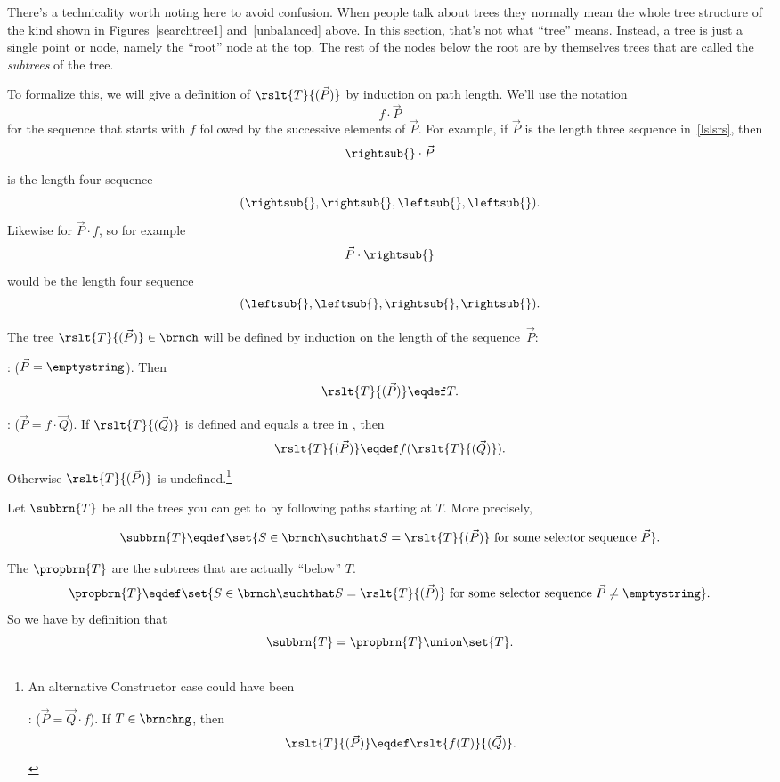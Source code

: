 \begin{definition}
There's a technicality worth noting here to avoid confusion.  When
people talk about trees they normally mean the whole tree structure of
the kind shown in Figures~\ref{searchtree1} and~\ref{unbalanced}
above.  In this section, that's not what ``tree'' means.  Instead, a
tree is just a single point or node, namely the ``root'' node at the
top.  The rest of the nodes below the root are by themselves trees
that are called the \emph{subtrees} of the tree.

To formalize this, we will give a definition of $\rslt{T}{(\vec{P})}$
by induction on path length.  We'll use the notation
\[
f \cdot \vec{P}
\]
for the sequence that starts with $f$ followed by the successive
elements of $\vec{P}$.  For example, if $\vec{P}$ is the length three
sequence in~\eqref{lslsrs}, then
\[
\rightsub{} \cdot \vec{P}
\]
is the length four sequence
\[
(\rightsub{},\rightsub{}, \leftsub{},\leftsub{}).
\]
Likewise for $\vec{P} \cdot f$, so for example
\[
 \vec{P} \cdot \rightsub{}
\]
would be the length four sequence
\[
(\leftsub{},\leftsub{},\rightsub{},\rightsub{}).
\]

\begin{definition}
The tree $\rslt{T}{(\vec{P})} \in \brnch$ will be defined by induction
on the length of the sequence~$\vec{P}$:

: ($\vec{P} = \emptystring$).
Then
\[
\rslt{T}{(\vec{P})} \eqdef T.
\]

: ($\vec{P} = f \cdot \vec{Q}$).  If
$\rslt{T}{(\vec{Q})}$ is defined and equals a tree in \brnchng, then
\[
\rslt{T}{(\vec{P})} \eqdef f(\rslt{T}{(\vec{Q})}).
\]
Otherwise $\rslt{T}{(\vec{P})}$ is undefined.\footnote{An alternative
  Constructor case could have been

: ($\vec{P} = \vec{Q} \cdot f$).  If
$T \in \brnchng$, then
\[
\rslt{T}{(\vec{P})} \eqdef \rslt{f(T)}{(\vec{Q})}.
\]}

\end{definition}
\medskip

Let $\subbrn{T}$ be all the trees you can get to by following paths
starting at $T$.  More precisely,
\begin{definition}\label{def:subtree}
\[
\subbrn{T} \eqdef \set{S \in \brnch \suchthat S =
  \rslt{T}{(\vec{P})}\ \text{for some selector sequence}\ \vec{P}}.
\]
\end{definition}

The  $\propbrn{T}$ are the subtrees that are
actually ``below'' $T$.
\[
\propbrn{T} \eqdef \set{S \in \brnch \suchthat S =
  \rslt{T}{(\vec{P})}\ \text{for some selector
    sequence}\ \vec{P}\neq \emptystring}.
\]
So we have by definition that
\begin{equation}\label{subtree-proptree}
\subbrn{T} = \propbrn{T} \union \set{T}.
\end{equation}


\end{definition}
